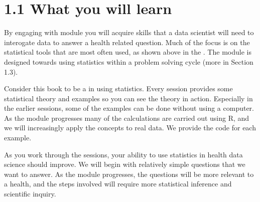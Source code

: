 \documentclass[letterpaper,10pt,english]{jupyterBook}
\begin{document}
\section{1.1 What you will learn}
\label{\detokenize{01. Introduction:what-you-will-learn}}
\sphinxAtStartPar
By engaging with module you will acquire skills that a data scientist will need to interogate data to answer a health related question. Much of the focus is on the statistical tools that are most often used, as shown above in the . The module is designed towards using statistics within a problem solving cycle (more in Section 1.3).

\sphinxAtStartPar
Consider this book to be a  in using statistics. Every session provides some statistical theory and examples so you can see the theory in action. Especially in the earlier sessions, some of the examples can be done without using a computer. As the module progresses many of the calculations are carried out using R, and we will increasingly apply the concepts to real data. We provide the code for each example.

\sphinxAtStartPar
As you work through the sessions, your ability to use statistics in health data science should improve. We will begin with relatively simple questions that we want to answer. As the module progresses, the questions will be more relevant to a health, and the steps involved will require more statistical inference and scientific inquiry.
\end{document}
